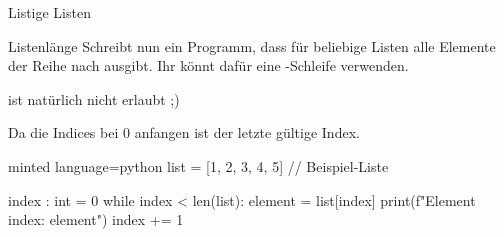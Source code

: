 \begin{task}[points=auto]{Listige Listen}
\begin{subtask*}[points=0]{Listenlänge }
        Schreibt nun ein Programm, dass für beliebige Listen alle Elemente der Reihe
        nach ausgibt. Ihr könnt dafür eine -Schleife verwenden.

        \begin{anmerkung}
             ist natürlich nicht erlaubt ;)
        \end{anmerkung}
        \begin{solution}
            Da die Indices bei 0 anfangen ist  der letzte gültige Index.

            \begin{codeBlock}[]{minted language=python}
                list = [1, 2, 3, 4, 5] // Beispiel-Liste

                index : int = 0
                while index < len(list):
                    element = list[index]
                    print(f"Element {index}: {element}")
                    index += 1
            \end{codeBlock}
        \end{solution}
    \end{subtask*}
\end{task}
